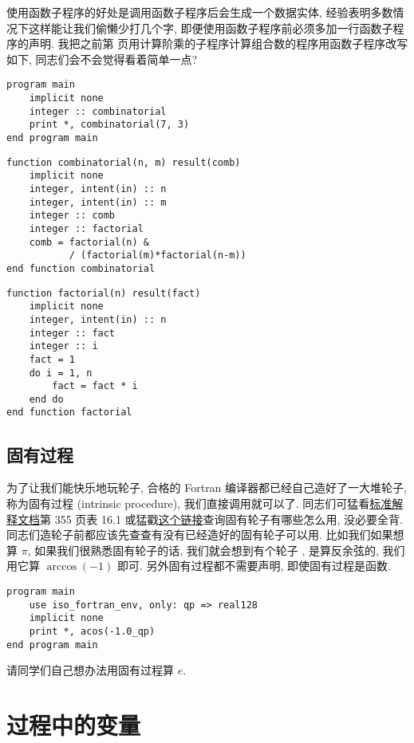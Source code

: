 使用函数子程序的好处是调用函数子程序后会生成一个数据实体, 经验表明多数情况下这样能让我们偷懒少打几个字, 即便使用函数子程序前必须多加一行函数子程序的声明. 我把之前第 \pageref{fact_comb} 页用计算阶乘的子程序计算组合数的程序用函数子程序改写如下, 同志们会不会觉得看着简单一点? 
\begin{lstlisting} 
program main
    implicit none
    integer :: combinatorial
    print *, combinatorial(7, 3)
end program main
\end{lstlisting}
\begin{lstlisting}
function combinatorial(n, m) result(comb)
    implicit none
    integer, intent(in) :: n
    integer, intent(in) :: m
    integer :: comb
    integer :: factorial
    comb = factorial(n) &
           / (factorial(m)*factorial(n-m))
end function combinatorial
\end{lstlisting}
\begin{lstlisting}
function factorial(n) result(fact)
    implicit none
    integer, intent(in) :: n
    integer :: fact
    integer :: i
    fact = 1
    do i = 1, n
        fact = fact * i
    end do
end function factorial
\end{lstlisting} 

\subsection{固有过程} 

\newcommand{\ip} [1]{\href{https://fortranwiki.org/fortran/show/#1} { \ttt{#1} } } 
为了让我们能快乐地玩轮子, 合格的 Fortran 编译器都已经自己造好了一大堆轮子, 称为固有过程 (intrinsic procedure), 我们直接调用就可以了. 同志们可猛看\href{https://j3-fortran.org/doc/year/24/24-007.pdf}{标准解释文档}第 355 页表 16.1 或猛戳\href{https://fortranwiki.org/fortran/show/Intrinsic+procedures}{这个链接}查询固有轮子有哪些怎么用, 没必要全背. 同志们造轮子前都应该先查查有没有已经造好的固有轮子可以用. 比如我们如果想算 $ \pi $, 如果我们很熟悉固有轮子的话, 我们就会想到有个轮子 , 是算反余弦的, 我们用它算 $ \arccos(-1) $ 即可. 另外固有过程都不需要声明, 即使固有过程是函数.
\begin{lstlisting} 
program main
    use iso_fortran_env, only: qp => real128
    implicit none
    print *, acos(-1.0_qp)
end program main
\end{lstlisting} 
请同学们自己想办法用固有过程算 $e$.

\section{过程中的变量}


